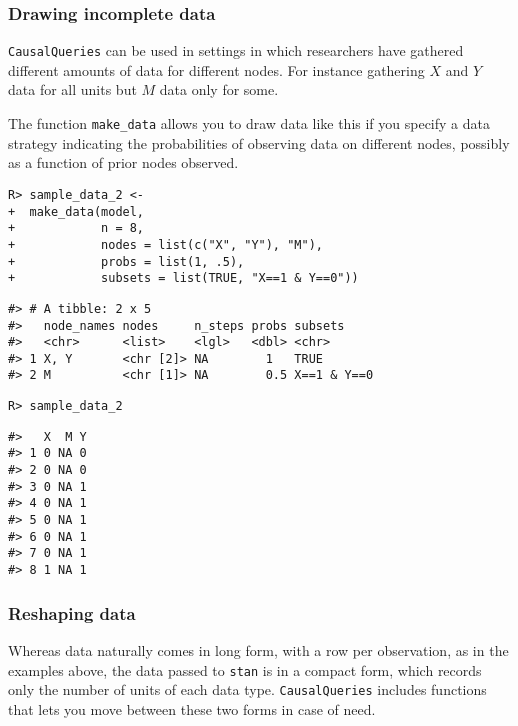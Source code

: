\documentclass[
  11pt,
  article]{jss}
\begin{document}
\hypertarget{drawing-incomplete-data}{%
\subsubsection{Drawing incomplete data}\label{drawing-incomplete-data}}

\texttt{CausalQueries} can be used in settings in which researchers have
gathered different amounts of data for different nodes. For instance
gathering \(X\) and \(Y\) data for all units but \(M\) data only for
some.

The function \texttt{make\_data} allows you to draw data like this if
you specify a data strategy indicating the probabilities of observing
data on different nodes, possibly as a function of prior nodes observed.

\begin{verbatim}
R> sample_data_2 <-
+  make_data(model,
+            n = 8,
+            nodes = list(c("X", "Y"), "M"),
+            probs = list(1, .5),
+            subsets = list(TRUE, "X==1 & Y==0"))
\end{verbatim}

\begin{verbatim}
#> # A tibble: 2 x 5
#>   node_names nodes     n_steps probs subsets    
#>   <chr>      <list>    <lgl>   <dbl> <chr>      
#> 1 X, Y       <chr [2]> NA        1   TRUE       
#> 2 M          <chr [1]> NA        0.5 X==1 & Y==0
\end{verbatim}

\begin{verbatim}
R> sample_data_2
\end{verbatim}

\begin{verbatim}
#>   X  M Y
#> 1 0 NA 0
#> 2 0 NA 0
#> 3 0 NA 1
#> 4 0 NA 1
#> 5 0 NA 1
#> 6 0 NA 1
#> 7 0 NA 1
#> 8 1 NA 1
\end{verbatim}

\hypertarget{reshaping-data}{%
\subsubsection{Reshaping data}\label{reshaping-data}}

Whereas data naturally comes in long form, with a row per observation,
as in the examples above, the data passed to \texttt{stan} is in a
compact form, which records only the number of units of each data type.
\texttt{CausalQueries} includes functions that lets you move between
these two forms in case of need.
\end{document}
